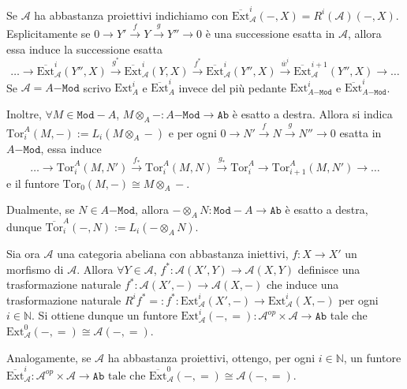    Se \(\mathcal{A}\) ha abbastanza proiettivi indichiamo con
\(\overline{\mathrm{Ext}}_\mathcal{A}^{i}{(-, X)} = R^{i}{(\mathcal{A})}{(-,
   X)}\). Esplicitamente se \(0 \to Y' \overset{f}{\to} Y \overset{g}{\to} Y''
   \to 0\) è una successione esatta in \(\mathcal{A}\), allora essa induce la
   successione esatta
   \[
    \dots \to \overline{\mathrm{Ext}}_\mathcal{A}^{i}{(Y'', X)} \overset{g^{*}}{\to}
\overline{\mathrm{Ext}}_\mathcal{A}^{i}{(Y, X)} \overset{f^{*}}{\to}
\overline{\mathrm{Ext}}_\mathcal{A}^{i}{(Y'', X)}
\overset{\overline{w}^{i}}{\to}
 \overline{\mathrm{Ext}}_\mathcal{A}^{i+1}{(Y'', X)} \to \dots
   \]
   Se \(\mathcal{A} =A\mathtt{-Mod}\) scrivo \(\mathrm{Ext}_A^{i}\) e
\(\overline{\mathrm{Ext}}_A^{i}\) invece del più pedante
   \(\mathrm{Ext}_{A\mathtt{-Mod}} ^{i}\) e
\(\overline{\mathrm{Ext}}_{A\mathtt{-Mod}} ^{i}\).

Inoltre, \(\forall M \in \mathtt{Mod-}A\), \(M \otimes_A - : A\mathtt{-Mod} \to
\mathtt{Ab}\) è esatto a destra. Allora si indica \(\mathrm{Tor}_i^{A}{(M, -)}
:= L_{i}{(M \otimes_A -)}\) e per ogni \(0 \to N' \overset{f}{\to} N
\overset{g}{\to} N'' \to 0\) esatta in \(A\mathtt{-Mod}\), essa induce
\[
  \dots \to \mathrm{Tor}_i^{A}{(M, N')} \overset{f_*}{\to}
  \mathrm{Tor}_i^{A}{(M, N)} \overset{g_*}{\to} \mathrm{Tor}_i^{A} \to
  \mathrm{Tor}_{i+1} ^{A}{(M, N')} \to \dots
\]
e il funtore \(\mathrm{Tor}_0{(M, -)} \cong M \otimes_A -\).

Dualmente, se \(N \in A\mathtt{-Mod}\), allora \(- \otimes_A N : \mathtt{Mod-}A
\to \mathtt{Ab}\) è esatto a destra, dunque \(\overline{\mathrm{Tor}}_i^{A}{(-,
N)} := L_{i}{(- \otimes_A N)}\).


Sia ora \(\mathcal{A}\) una categoria abeliana con abbastanza iniettivi, \(f : X
\to X'\) un morfismo di \(\mathcal{A}\). Allora \(\forall Y \in \mathcal{A}\),
\(f^{*} : \mathcal{A}{(X', Y)} \to \mathcal{A}{(X, Y)}\) definisce una
trasformazione naturale \(f^{*} : \mathcal{A}{(X', -)} \to \mathcal{A}{(X, -)}\)
che induce una trasformazione naturale \(R^{i}f^{*} =: f^{*} :
\mathrm{Ext}_\mathcal{A}^{i}{(X', -)} \to \mathrm{Ext}^{i}_\mathcal{A}{(X, -)}\)
per ogni \(i \in \mathbb{N}\). Si ottiene dunque un funtore
\(\mathrm{Ext}_\mathcal{A}^{i}{(-, =)} : \mathcal{A}^{op} \times \mathcal{A} \to
\mathtt{Ab}\) tale che \(\mathrm{Ext}_\mathcal{A}^{0}{(-, =)} \cong
\mathcal{A}{(-, =)}\). 

Analogamente, se \(\mathcal{A}\) ha abbastanza proiettivi, ottengo, per ogni \(i
\in \mathbb{N}\), un funtore \(
  \overline{\mathrm{Ext}}_\mathcal{A}^{i} : \mathcal{A}^{op} \times \mathcal{A}
  \to \mathtt{Ab} \text{ tale che } \overline{\mathrm{Ext}}_\mathcal{A}^{0}{(-,
  =)} \cong \mathcal{A}{(-, =)}
\). 

